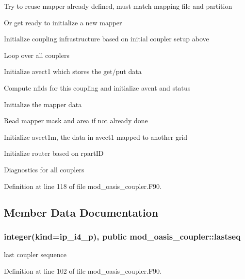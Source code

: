 \begin{DoxyItemize}
\begin{DoxyItemize}
\begin{DoxyItemize}
\begin{DoxyItemize}
\item Try to reuse mapper already defined, must match mapping file and partition
\item Or get ready to initialize a new mapper
\end{DoxyItemize}
\end{DoxyItemize}
\end{DoxyItemize}
\item Initialize coupling infrastructure based on initial coupler setup above
\item Loop over all couplers
\begin{DoxyItemize}
\item Initialize avect1 which stores the get/put data
\item Compute nflds for this coupling and initialize avcnt and status
\item Initialize the mapper data
\item Read mapper mask and area if not already done
\item Initialize avect1m, the data in avect1 mapped to another grid
\item Initialize router based on rpart\+I\+D
\end{DoxyItemize}
\item Diagnostics for all couplers 
\end{DoxyItemize}

Definition at line 118 of file mod\+\_\+oasis\+\_\+coupler.\+F90.



\subsection{Member Data Documentation}
\hypertarget{classmod__oasis__coupler_a0cb9b8a96c10385d38fa244d920c7eaf}{
\subsubsection[{lastseq}]{\setlength{\rightskip}{0pt plus 5cm}integer(kind=ip\+\_\+i4\+\_\+p), public mod\+\_\+oasis\+\_\+coupler\+::lastseq}}\label{classmod__oasis__coupler_a0cb9b8a96c10385d38fa244d920c7eaf}


last coupler sequence 



Definition at line 102 of file mod\+\_\+oasis\+\_\+coupler.\+F90.

